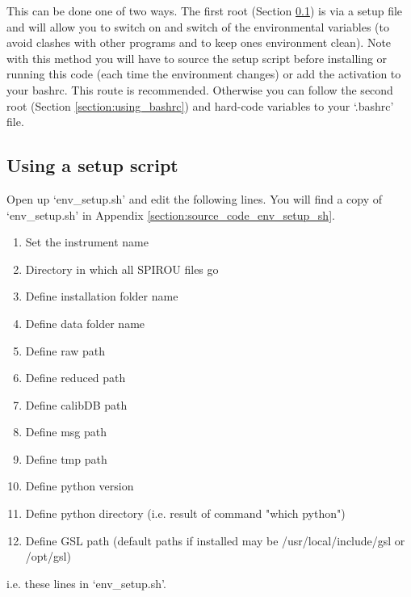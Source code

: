 This can be done one of two ways. The first root (Section \ref{section:using_setup_sh}) is via a setup file and will allow you to switch on and switch of the environmental variables (to avoid clashes with other programs and to keep ones environment clean). Note with this method you will have to source the setup script before installing or running this code (each time the environment changes) or add the activation to your bashrc. This route is recommended. Otherwise you can follow the second root (Section \ref{section:using_bashrc}) and hard-code variables to your `.bashrc' file.

\subsection{Using a setup script}
\label{section:using_setup_sh}

\noindent Open up `env\_setup.sh' and edit the following lines. You will find a copy of `env\_setup.sh' in Appendix \ref{section:source_code_env_setup_sh}.

\begin{enumerate}
\item Set the instrument name 
\item Directory in which all SPIROU files go 
\item Define installation folder name 
\item Define data folder name 
\item Define raw path 
\item Define reduced path 
\item Define calibDB path 
\item Define msg path 
\item Define tmp path 
\item Define python version 
\item Define python directory (i.e. result of command "which python") 
\item Define GSL path (default paths if installed may be /usr/local/include/gsl or /opt/gsl) 
\end{enumerate}

\noindent i.e. these lines in `env\_setup.sh'.

